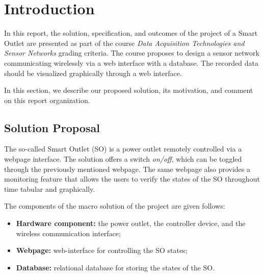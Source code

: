 %
%
%
%


\section{Introduction}
\label{sec:intro}

In this report, the solution, specification, and outcomes of the project of a
Smart Outlet are presented as part of the course \textit{Data Acquisition
Technologies and Sensor Networks} grading criteria. The course proposes to
design a sensor network communicating wirelessly via a web interface with a
database. The recorded data should be visualized graphically through a
web interface.

In this section, we describe our proposed solution, its motivation, and comment
on this report organization.

\subsection{Solution Proposal}

The so-called Smart Outlet (SO) is a power outlet remotely controlled via a webpage
interface. The solution offers a switch \textit{on/off}, which can be toggled
through the previously mentioned webpage. The same webpage also provides a
monitoring feature that allows the users to verify the states of the SO
throughout time tabular and graphically.

The components of the macro solution of the project are given follows:

\begin{itemize}
    \item \textbf{Hardware component:} the power outlet, the controller device,
    and the wireless communication interface;
    \item \textbf{Webpage:} web-interface for controlling the SO states;
    \item \textbf{Database:} relational database for storing the states of the SO.
\end{itemize}

